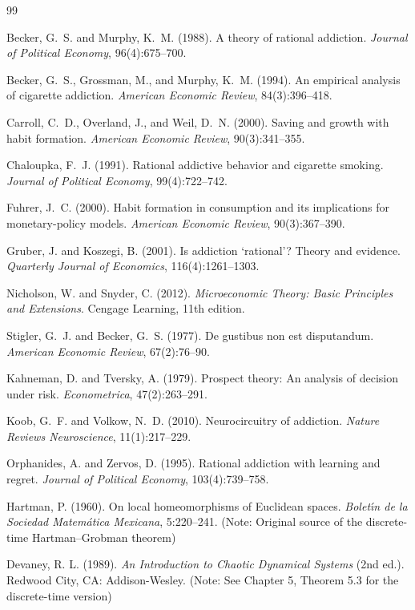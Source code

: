 \documentclass[12pt]{article}
\begin{document}
\begin{thebibliography}{99}

Becker, G.~S. and Murphy, K.~M. (1988).
A theory of rational addiction.
\textit{Journal of Political Economy}, 96(4):675--700.

Becker, G.~S., Grossman, M., and Murphy, K.~M. (1994).
An empirical analysis of cigarette addiction.
\textit{American Economic Review}, 84(3):396--418.

Carroll, C.~D., Overland, J., and Weil, D.~N. (2000).
Saving and growth with habit formation.
\textit{American Economic Review}, 90(3):341--355.

Chaloupka, F.~J. (1991).
Rational addictive behavior and cigarette smoking.
\textit{Journal of Political Economy}, 99(4):722--742.

Fuhrer, J.~C. (2000).
Habit formation in consumption and its implications for monetary-policy models.
\textit{American Economic Review}, 90(3):367--390.

Gruber, J. and Koszegi, B. (2001).
Is addiction `rational'? Theory and evidence.
\textit{Quarterly Journal of Economics}, 116(4):1261--1303.

Nicholson, W. and Snyder, C. (2012).
\textit{Microeconomic Theory: Basic Principles and Extensions}.
Cengage Learning, 11th edition.

Stigler, G.~J. and Becker, G.~S. (1977).
De gustibus non est disputandum.
\textit{American Economic Review}, 67(2):76--90.

Kahneman, D. and Tversky, A. (1979).
Prospect theory: An analysis of decision under risk.
\textit{Econometrica}, 47(2):263--291.

Koob, G.~F. and Volkow, N.~D. (2010).
Neurocircuitry of addiction.
\textit{Nature Reviews Neuroscience}, 11(1):217--229.

Orphanides, A. and Zervos, D. (1995).
Rational addiction with learning and regret.
\textit{Journal of Political Economy}, 103(4):739--758.

Hartman, P. (1960).
On local homeomorphisms of Euclidean spaces.
\textit{Bolet{\'\i}n de la Sociedad Matem{\'a}tica Mexicana}, 5:220--241.
(Note: Original source of the discrete-time Hartman--Grobman theorem)

Devaney, R. L. (1989).
\textit{An Introduction to Chaotic Dynamical Systems} (2nd ed.).
Redwood City, CA: Addison-Wesley.
(Note: See Chapter 5, Theorem 5.3 for the discrete-time version)

\end{thebibliography}
\end{document}
